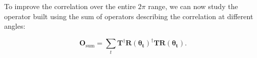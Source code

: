 \documentclass[aps,prl,twocolumn, amsmath,amssymb,superscriptaddress]{revtex4-2}
\begin{document}
To improve the correlation over the entire $2\pi$ range, 
we can now study the operator built using the sum of operators describing the correlation at different angles:


\begin{equation}
    \mathbf{O}_\text{sum}=\sum_t\mathbf{T}^\dagger\mathbf{R(\theta_t)}^\dagger\mathbf{T}\mathbf{R(\theta_t)} .%
    \label{eq:RME_sum_op}
\end{equation}


\end{document}

